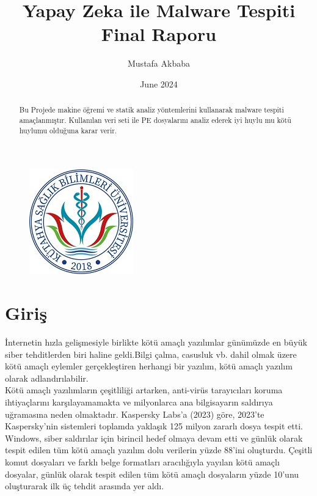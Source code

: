 \documentclass{article}
\title{Yapay Zeka ile Malware Tespiti
Final Raporu}
\author{Mustafa Akbaba}
\date{June 2024}
\begin{document}
\begin{figure}
    \centering
        \includegraphics{logo-1.jpg}
\end{figure}
\maketitle

\begin{abstract}
\noindent Bu Projede makine öğremi ve statik analiz yöntemlerini kullanarak malware tespiti amaçlanmıştır. Kullanılan veri seti ile PE dosyalarını analiz ederek iyi huylu mu kötü huylumu olduğuna karar verir.
\end{abstract}

\section{Giriş}
İnternetin hızla gelişmesiyle birlikte kötü amaçlı yazılımlar günümüzde en büyük  siber tehditlerden biri haline geldi.Bilgi çalma, casusluk vb. dahil olmak üzere kötü amaçlı eylemler gerçekleştiren herhangi bir yazılım, kötü amaçlı yazılım olarak adlandırılabilir. \\
Kötü amaçlı yazılımların çeşitliliği artarken, anti-virüs tarayıcıları koruma ihtiyaçlarını karşılayamamakta ve milyonlarca ana bilgisayarın saldırıya uğramasına neden olmaktadır. Kaspersky Labs'a (2023) göre\cite{kasper}, 2023'te Kaspersky'nin sistemleri toplamda yaklaşık 125 milyon zararlı dosya tespit etti. Windows, siber saldırılar için birincil hedef olmaya devam etti ve günlük olarak tespit edilen tüm kötü amaçlı yazılım dolu verilerin yüzde 88'ini oluşturdu. Çeşitli komut dosyaları ve farklı belge formatları aracılığıyla yayılan kötü amaçlı dosyalar, günlük olarak tespit edilen tüm kötü amaçlı dosyaların yüzde 10'unu oluşturarak ilk üç tehdit arasında yer aldı.
\end{document}

